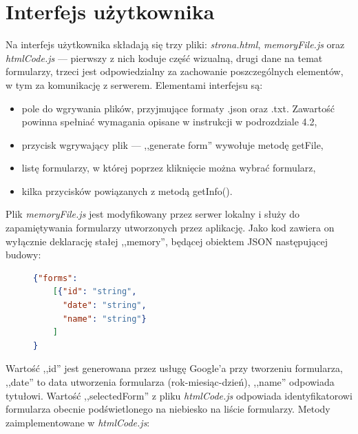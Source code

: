 \section{Interfejs użytkownika}
Na interfejs użytkownika składają się trzy pliki: \textit{strona.html}, \textit{memoryFile.js} oraz \textit{htmlCode.js} --- pierwszy z nich koduje część wizualną, drugi dane na temat formularzy, trzeci jest odpowiedzialny za zachowanie poszczególnych elementów, w tym za komunikację z serwerem. 
\ind Elementami interfejsu są:
\begin{itemize}
\item pole do wgrywania plików, przyjmujące formaty .json oraz .txt. Zawartość powinna spełniać wymagania opisane w instrukcji w podrozdziale 4.2, %
\item przycisk wgrywający plik --- ,,generate form'' wywołuje metodę getFile,
\item listę formularzy, w której poprzez kliknięcie można wybrać formularz,
\item kilka przycisków powiązanych z metodą getInfo().
\end{itemize}
\ind Plik \textit{memoryFile.js} jest modyfikowany przez serwer lokalny i służy do zapamiętywania formularzy utworzonych przez aplikację. Jako kod zawiera on wyłącznie deklarację stałej ,,memory'', będącej obiektem JSON następującej budowy:
\begin{figure}[H]
\begin{lstlisting}[language=json,firstnumber=1]
{"forms":
    [{"id": "string",
      "date": "string",
      "name": "string"}
    ]
}
\end{lstlisting}
\end{figure}
Wartość ,,id'' jest generowana przez usługę Google'a przy tworzeniu formularza, ,,date'' to data utworzenia formularza (rok-miesiąc-dzień), ,,name'' odpowiada tytułowi.
\ind Wartość ,,selectedForm'' z pliku \textit{htmlCode.js} odpowiada identyfikatorowi formularza obecnie podświetlonego na niebiesko na liście formularzy. Metody zaimplementowane w \textit{htmlCode.js}:

